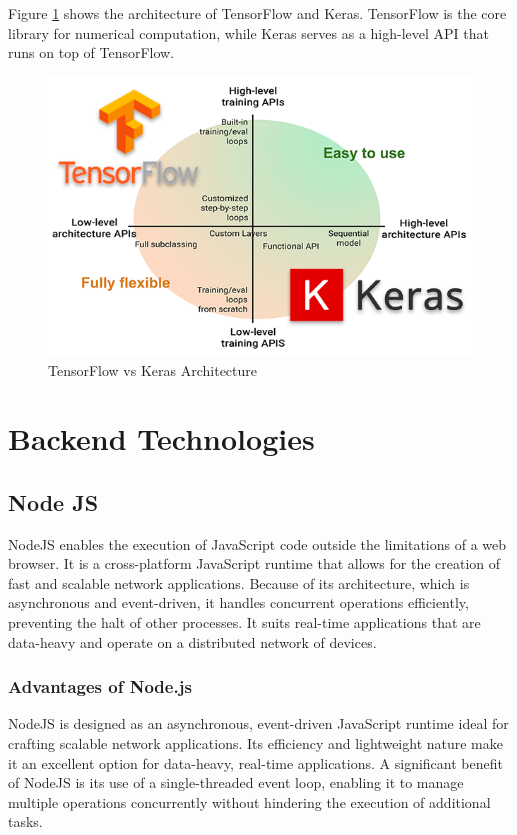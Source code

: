 Figure \ref{fig:Keras} shows the architecture of TensorFlow and Keras. TensorFlow is the core library for numerical computation, while Keras serves as a high-level API
that runs on top of TensorFlow. 

\begin{figure}[H]
    \centering
    \includegraphics[width=0.8\linewidth]{images/keras.png}
    \caption{TensorFlow vs Keras Architecture}
    \label{fig:Keras}        
\end{figure}


\section{Backend Technologies}

\subsection{Node JS}

NodeJS enables the execution of JavaScript code outside the limitations of a web browser. It is a cross-platform JavaScript runtime that allows for the creation of
fast and scalable network applications. Because of its architecture, which is asynchronous and event-driven, it handles concurrent operations efficiently, preventing the halt of
other processes. It suits real-time applications that are data-heavy and operate on a distributed network of devices. \cite{nodejs}

\subsubsection*{Advantages of Node.js}
NodeJS is designed as an asynchronous, event-driven JavaScript runtime ideal for crafting scalable network applications. Its efficiency and lightweight nature make it an excellent option for data-heavy, real-time applications.\cite{tilkov}
A significant benefit of NodeJS is its use of a single-threaded event loop, enabling it to manage multiple operations concurrently without hindering the execution of additional tasks.

